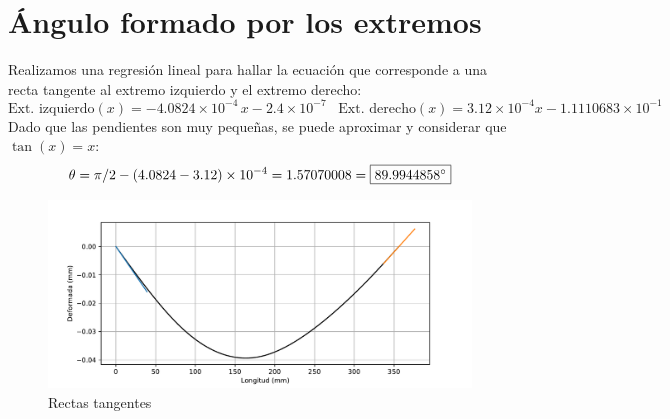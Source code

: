 \documentclass[a4paper,11pt]{report}
\begin{document}
\chapter{Ángulo formado por los extremos}
Realizamos una regresión lineal para hallar la ecuación que corresponde a una recta tangente al extremo izquierdo y el extremo derecho:
$$
\text{Ext. izquierdo}(x) = -4.0824\times 10^{-4}\,x - 2.4\times 10^{-7} \hspace{10pt} \text{Ext. derecho}(x) = 3.12\times 10^{-4}x - 1.1110683\times 10^{-1}
$$
Dado que las pendientes son muy pequeñas, se puede aproximar y considerar que $\tan (x) = x$:
$$
\theta = \pi /2 - (4.0824-3.12)\times 10^{-4} = 1.57070008 = \fbox{$89.9944858^{\circ}$}
$$
\begin{figure}[H]
\includegraphics[scale=0.72]{ang.pdf}
\caption{Rectas tangentes}
\end{figure}
\end{document}
